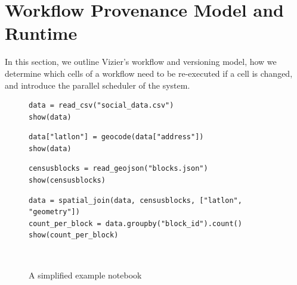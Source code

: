 \section{Workflow Provenance Model and Runtime}
\label{sec:vizier-workflows}

In this section, we outline Vizier's workflow and versioning model, how we determine which cells of a workflow need to be re-executed if a cell is changed, and introduce the parallel scheduler of the system.


\newcommand{\notebook}{\mathcal N}
\newcommand{\workflow}{\mathcal W}
\newcommand{\artifact}{a}
\newcommand{\nbcell}{c}
\newcommand{\outputval}{o}
\newcommand{\readset}{\vec r}
\newcommand{\writeset}{\vec w}
\newcommand{\globalscope}{\mathcal G}
\newcommand{\outputdomain}{\mathcal O}
\newcommand{\valuedomain}{\mathcal D}
\newcommand{\undefinedval}{\bot}
\newcommand{\unknownval}{\circledcirc}
\newcommand{\keyset}{\texttt{keys}}
\newcommand{\changeset}{\Delta}
\newcommand{\variabledomain}{\Sigma}
\newcommand{\diff}[2]{\Delta(#1, #2)}
\newcommand{\evalnb}[1]{\llbracket #1 \rrbracket}

\begin{figure}
  \centering
  \begin{minipage}{0.9\textwidth}
  \begin{lstlisting}[style=pynotebook]
data = read_csv("social_data.csv")
show(data)
  \end{lstlisting}

  \begin{lstlisting}[style=pynotebook]
data["latlon"] = geocode(data["address"])
show(data)
  \end{lstlisting}

  \begin{lstlisting}[style=pynotebook]
censusblocks = read_geojson("blocks.json")
show(censusblocks)
  \end{lstlisting}

  \begin{lstlisting}[style=pynotebook]
data = spatial_join(data, censusblocks, ["latlon", "geometry"])
count_per_block = data.groupby("block_id").count()
show(count_per_block)
  \end{lstlisting}
  \end{minipage}\\[-4mm]
  \caption{A simplified example notebook}
  \label{fig:exampleNotebook}
\end{figure}

